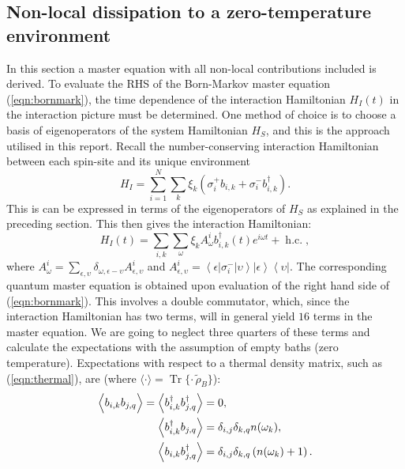 \documentclass[11pt,a4paper,article,oneside]{memoir}
\DeclareMathOperator{\Hc}{h.c.}  \DeclareMathOperator{\Tr}{Tr}
\newcommand{\bra}[1]{\left\langle #1\right|}
\newcommand{\ket}[1]{\left| #1\right\rangle}
\newcommand{\outr}[2]{\left| #1\right\rangle\left\langle #2\right|}
\begin{document}
\subsection{Non-local dissipation to a zero-temperature environment}
In this section a master equation with all non-local contributions
included is derived. To evaluate the RHS of the Born-Markov master
equation (\ref{eqn:bornmark}), the time dependence of the interaction
Hamiltonian $H_I(t)$ in the interaction picture must be
determined. One method of choice is to choose a basis of
eigenoperators of the system Hamiltonian $H_S$, and this is the
approach utilised in this report. Recall the number-conserving
interaction Hamiltonian between each spin-site and its unique
environment
\begin{equation}
	H_I=\sum_{i=1}^N\sum_k
        \xi_k\left(\sigma^+_ib_{i,k}+\sigma^-_ib^\dagger_{i,k}\right).
\end{equation}
This is can be expressed in terms of the eigenoperators of $H_S$ as
explained in the preceding section. This then gives the interaction
Hamiltonian:
\begin{equation}
	H_I(t)=\sum_{i,k}\sum_{\omega}\xi_k A^i_\omega
        b^\dagger_{i,k}(t)e^{i\omega t}+\Hc,
    \label{eqn:HIeigen}
\end{equation}
where $A^{i}_\omega =
\sum_{\epsilon,\upsilon}\delta_{\omega,\epsilon-\upsilon}A^{i}_{\epsilon,\upsilon}$
and $A^{i}_{\epsilon,\upsilon} =
\bra{\epsilon}\sigma^-_i\ket{\upsilon} \outr{\epsilon}{\upsilon}$. The
corresponding quantum master equation is obtained upon evaluation of
the right hand side of (\ref{eqn:bornmark}). This involves a double
commutator, which, since the interaction Hamiltonian has two terms,
will in general yield $16$ terms in the master equation. We are going
to neglect three quarters of these terms and calculate the
expectations with the assumption of empty baths (zero
temperature). Expectations with respect to a thermal density matrix,
such as (\ref{eqn:thermal}), are (where
$\langle\cdot\rangle=\Tr\{\cdot\,\tilde{\rho}_B\}$):
\begin{align}
	\Big\langle b_{i,k}b_{j,q}\Big\rangle = \left\langle
        b^\dagger_{i,k}b^\dagger_{j,q}\right\rangle &= 0,\notag
        \\ \left\langle b^\dagger_{i,k}b_{j,q}\right\rangle
        &=\delta_{i,j}\delta_{k,q}n(\omega_{k}),\notag\\ \left\langle
        b_{i,k}b^\dagger_{j,q}\right\rangle
        &=\delta_{i,j}\delta_{k,q}\left(n(\omega_{k})+1\right).
\end{align}
\end{document}
